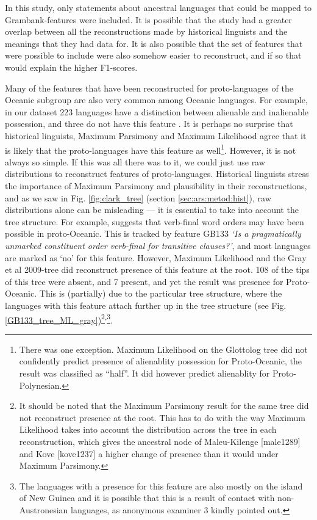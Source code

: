 \documentclass[a4paper,10pt]{article} %
\begin{document}
In this study, only statements about ancestral languages that could be mapped to Grambank-features were included. It is  possible that the \citet{jager2018using} study had a greater overlap between all the reconstructions made by historical linguists and the meanings that they had data for. It is also possible that the set of features that were possible to include were also somehow easier to reconstruct, and if so that would explain the higher F1-scores.

Many of the features that have been reconstructed for proto-languages of the Oceanic subgroup are also very common among Oceanic languages. For example, in our dataset 223 languages have a distinction between alienable and inalienable possession, and three do not have this feature . It is perhaps no surprise that historical linguists, Maximum Parsimony and Maximum Likelihood  agree that it is likely that the proto-languages have this feature as well\footnote{There was one exception. Maximum Likelihood on the Glottolog tree did not confidently predict presence of alienablity possession for Proto-Oceanic, the result was classified as ``half''. It did however predict alienablity for Proto-Polynesian.}. However, it is not always so simple. If this was all there was to it, we could just use raw distributions to reconstruct features of proto-languages. Historical linguists stress the importance of Maximum Parsimony and plausibility in their reconstructions, and as we saw in Fig. \ref{fig:clark_tree} (section \ref{sec:ars:metod:hist}), raw distributions alone can be misleading --- it is essential to take into account the tree structure. For example, \citet[118]{pawley1973some} suggests that verb-final word orders may have been possible in proto-Oceanic. This is tracked by feature GB133 \emph{`Is a pragmatically unmarked constituent order verb-final for transitive clauses?'}, and most languages are marked as `no' for this feature. However, Maximum Likelihood and the Gray et al 2009-tree did reconstruct presence of this feature at the root. 108 of the tips of this tree were absent, and 7 present, and yet the result was presence for Proto-Oceanic. This is (partially) due to the particular tree structure, where the languages with this feature attach further up in the tree structure (see Fig. \ref{GB133_tree_ML_gray})\footnote{It should be noted that the Maximum Parsimony result for the same tree did not reconstruct presence at the root. This has to do with the way Maximum Likelihood takes into account the distribution across the tree in each reconstruction, which gives the ancestral node of Maleu-Kilenge [male1289] and Kove [kove1237] a higher change of presence than it would under Maximum Parsimony.}\textsuperscript{,}\footnote{The languages with a presence for this feature are also mostly on the island of New Guinea and it is possible that this is a result of contact with non-Austronesian languages, as anonymous examiner 3 kindly pointed out.}.
\end{document}
